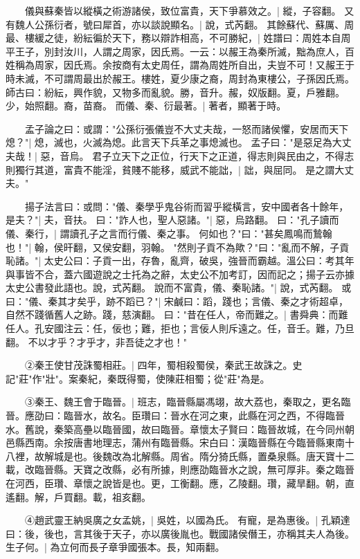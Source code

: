 　　儀與蘇秦皆以縱橫之術游諸侯，致位富貴，天下爭慕效之。|{
	縱，子容翻。
	}
又有魏人公孫衍者，號曰犀首，亦以談說顯名。|{
	說，式芮翻。
	}
其餘蘇代、蘇厲、周最、樓緩之徒，紛紜徧於天下，務以辯詐相高，不可勝紀，|{
	姓譜曰：周姓本自周平王子，別封汝川，人謂之周家，因氏焉。一云：以赧王為秦所滅，黜為庶人，百姓稱為周家，因氏焉。余按商有太史周任，謂為周姓所自出，夫豈不可！又赧王于時未滅，不可謂周最出於赧王。樓姓，夏少康之裔，周封為東樓公，子孫因氏焉。師古曰：紛紜，興作貌，又物多而亂貌。勝，音升。赧，奴版翻。夏，戶雅翻。少，始照翻。裔，苗裔。
	}
而儀、秦、衍最著。|{
	著者，顯著于時。
	}

　　孟子論之曰：或謂："公孫衍張儀豈不大丈夫哉，一怒而諸侯懼，安居而天下熄？"|{
	熄，滅也，火滅為熄。此言天下兵革之事熄滅也。
	}
孟子曰："是惡足為大丈夫哉！|{
	惡，音烏。
	}
君子立天下之正位，行天下之正道，得志則與民由之，不得志則獨行其道，富貴不能淫，貧賤不能移，威武不能詘，|{
	詘，與屈同。
	}
是之謂大丈夫。"

　　揚子法言曰：或問："儀、秦學乎鬼谷術而習乎縱橫言，安中國者各十餘年，是夫？"|{
	夫，音扶。
	}
曰："詐人也，聖人惡諸。"|{
	惡，烏路翻。
	}
曰："孔子讀而儀、秦行，|{
	謂讀孔子之言而行儀、秦之事。
	}
何如也？"曰："甚矣鳳鳴而鷙翰也！"|{
	翰，侯旰翻，又侯安翻，羽翰。
	}
"然則子貢不為歟？"曰："亂而不解，子貢恥諸。"|{
	太史公曰：子貢一出，存魯，亂齊，破吳，強晉而霸越。溫公曰：考其年與事皆不合，蓋六國遊說之士托為之辭，太史公不加考訂，因而記之；揚子云亦據太史公書發此語也。說，式芮翻。
	}
說而不富貴，儀、秦恥諸。"|{
	說，式芮翻。
	}
或曰："儀、秦其才矣乎，跡不蹈已？"|{
	宋鹹曰：蹈，踐也；言儀、秦之才術超卓，自然不踐循舊人之跡。踐，慈演翻。
	}
曰："昔在任人，帝而難之。|{
	書舜典：而難任人。孔安國注云：任，佞也；難，拒也；言佞人則斥遠之。任，音壬。難，乃旦翻。
	}
不以才乎？才乎才，非吾徒之才也！"

　　②秦王使甘茂誅蜀相莊。|{
	四年，蜀相殺蜀侯，秦武王故誅之。史記"莊"作"壯"。案秦紀，秦既得蜀，使陳莊相蜀；從"莊"為是。
	}

　　③秦王、魏王會于臨晉。|{
	班志，臨晉縣屬馮翊，故大荔也，秦取之，更名臨晉。應劭曰：臨晉水，故名。臣瓚曰：晉水在河之東，此縣在河之西，不得臨晉水。舊說，秦築高壘以臨晉國，故曰臨晉。章懷太子賢曰：臨晉故城，在今同州朝邑縣西南。余按唐書地理志，蒲州有臨晉縣。宋白曰：漢臨晉縣在今臨晉縣東南十八裡，故解城是也。後魏改為北解縣。周省。隋分猗氏縣，置桑泉縣。唐天寶十二載，改臨晉縣。天寶之改縣，必有所據，則應劭臨晉水之說，無可厚非。秦之臨晉在河西，臣瓚、章懷之說皆是也。更，工衡翻。應，乙陵翻。瓚，藏旱翻。朝，直遙翻。解，戶買翻。載，祖亥翻。
	}

　　④趙武靈王納吳廣之女孟姚，|{
	吳姓，以國為氏。
	}
有寵，是為惠後。|{
	孔穎達曰：後，後也，言其後于天子，亦以廣後胤也。戰國諸侯僭王，亦稱其夫人為後。
	}
生子何。|{
	為立何而長子章爭國張本。長，知兩翻。
	}

